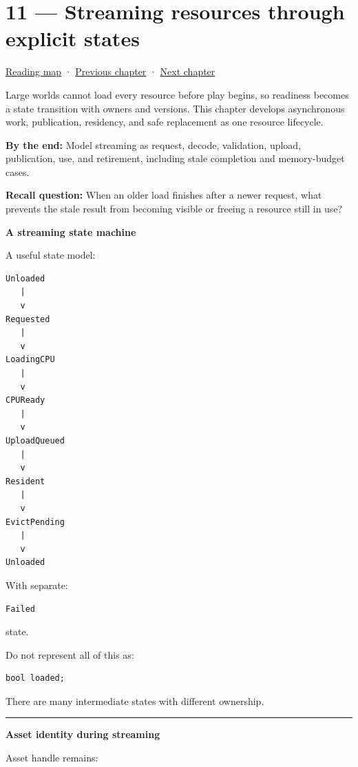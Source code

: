 \hypertarget{05-engine-i-ch011}{}
\section{11 --- Streaming resources through explicit states}\label{streaming-resources-through-explicit-states}

\href{Chapter\%20Edition/03\%20-\%20Game\%20Engine/00\%20-\%20Reading\%20Map}{Reading map} · \hyperref[05-engine-i-ch010]{Previous chapter} · \hyperref[05-engine-i-ch012]{Next chapter}

Large worlds cannot load every resource before play begins, so readiness becomes a state transition with owners and versions. This chapter develops asynchronous work, publication, residency, and safe replacement as one resource lifecycle.

\textbf{By the end:} Model streaming as request, decode, validation, upload, publication, use, and retirement, including stale completion and memory-budget cases.

\textbf{Recall question:} When an older load finishes after a newer request, what prevents the stale result from becoming visible or freeing a resource still in use?

\textbf{A streaming state machine}

A useful state model:

\begin{verbatim}
Unloaded
   |
   v
Requested
   |
   v
LoadingCPU
   |
   v
CPUReady
   |
   v
UploadQueued
   |
   v
Resident
   |
   v
EvictPending
   |
   v
Unloaded
\end{verbatim}

With separate:

\begin{verbatim}
Failed
\end{verbatim}

state.

Do not represent all of this as:

\begin{verbatim}
bool loaded;
\end{verbatim}

There are many intermediate states with different ownership.

\begin{center}\rule{0.5\linewidth}{0.5pt}\end{center}

\textbf{Asset identity during streaming}

Asset handle remains:

